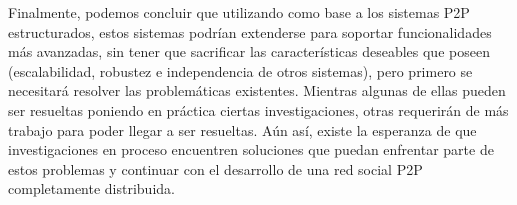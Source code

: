 Finalmente, podemos concluir que utilizando como base a los sistemas P2P
estructurados, estos sistemas podrían extenderse para soportar funcionalidades
más avanzadas, sin tener que sacrificar las características deseables que
poseen (escalabilidad, robustez e independencia de otros sistemas), pero
primero se necesitará resolver las problemáticas existentes. Mientras algunas de
ellas pueden ser resueltas poniendo en práctica ciertas investigaciones, otras
requerirán de más trabajo para poder llegar a ser resueltas.
Aún así, existe la esperanza de que investigaciones en proceso encuentren soluciones que puedan
enfrentar parte de estos problemas y continuar con el desarrollo de una red
social P2P completamente distribuida.

